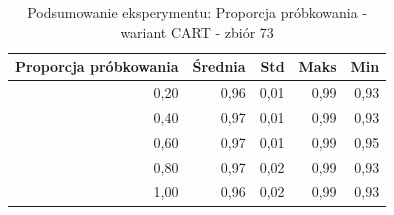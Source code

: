\begin{table}[htbp]
\centering
\small
\setlength{\tabcolsep}{6pt}
\renewcommand{\arraystretch}{1.2}
\caption{Podsumowanie eksperymentu: Proporcja próbkowania - wariant CART - zbiór 73}
\label{tab:CART_sample_ratio_73}
\begin{tabular}{r|r|r|r|r}
\toprule
Proporcja próbkowania & Średnia & Std & Maks & Min \\
\hline
0,20 & 0,96 & 0,01 & 0,99 & 0,93 \\
0,40 & 0,97 & 0,01 & 0,99 & 0,93 \\
0,60 & 0,97 & 0,01 & 0,99 & 0,95 \\
0,80 & 0,97 & 0,02 & 0,99 & 0,93 \\
1,00 & 0,96 & 0,02 & 0,99 & 0,93 \\
\bottomrule
\end{tabular}
\end{table}